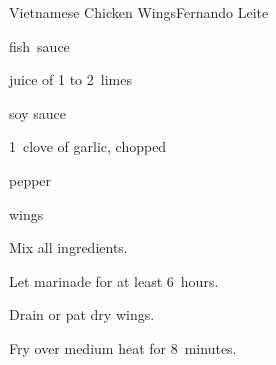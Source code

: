 \begin{recipe}{Vietnamese Chicken Wings}{Fernando Leite}{}

\begin{ingredients}
\item {} fish~sauce
\item juice of 1 to 2~limes
\item {} soy sauce
\item 1~clove of garlic, chopped
\item pepper
\item {} wings
\end{ingredients}

\begin{directions}
\item Mix all ingredients.
\item Let marinade for at least 6~hours.
\item Drain or pat dry wings.
\item Fry over medium heat for 8~minutes.
\end{directions}

\end{recipe}
